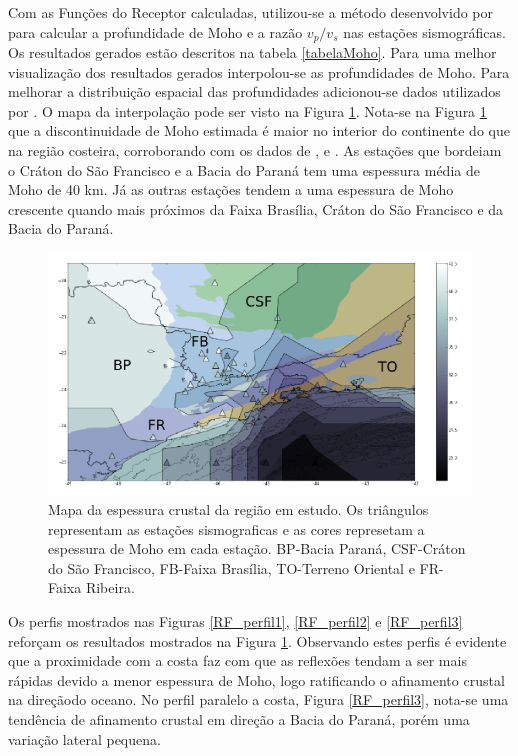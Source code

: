 Com as Funções do Receptor calculadas, utilizou-se a método desenvolvido por \cite{Zhu_Kanamori_2000} para calcular a profundidade de Moho e a razão $v_{p}/v_{s}$ nas estações sismográficas. Os resultados gerados estão descritos na tabela \ref{tabelaMoho}. Para uma melhor visualização dos resultados gerados interpolou-se as profundidades de Moho. Para melhorar a distribuição espacial das profundidades adicionou-se dados utilizados por \cite{Assumpcao_Brazil_2013}. O mapa da interpolação pode ser visto na Figura \ref{Interpolacao}. Nota-se na Figura \ref{Interpolacao} que a discontinuidade de Moho estimada é maior no interior do continente do que na região costeira, corroborando com os dados de \cite{Assumpcao_America_2013}, \cite{Assumpcao_Brazil_2013} e \cite{van_der_meijde_gravity_2013}. As estações que bordeiam o Cráton do São Francisco e a Bacia do Paraná tem uma espessura média de Moho de 40 km. Já as outras estações tendem a uma espessura de Moho crescente quando mais próximos da Faixa Brasília, Cráton do São Francisco e da Bacia do Paraná.

\begin{figure}[!ht]
\centering
\includegraphics[scale=0.5]{Figs/Interpolacao_Linear.png}
\caption[Mapa da espessura crustal da região em estudo.]{Mapa da espessura crustal da região em estudo. Os triângulos representam as estações sismograficas e as cores represetam a espessura de Moho em cada estação. BP-Bacia Paraná, CSF-Cráton do São Francisco, FB-Faixa Brasília, TO-Terreno Oriental  e FR-Faixa Ribeira.}
\label{Interpolacao}
\end{figure}

Os perfis mostrados nas Figuras \ref{RF_perfil1}, \ref{RF_perfil2} e \ref{RF_perfil3} reforçam  os resultados mostrados na Figura \ref{Interpolacao}. Observando estes perfis é evidente que a proximidade com a costa  faz com que as reflexões tendam a ser mais rápidas devido a menor espessura de Moho, logo ratificando o afinamento crustal na direçãodo oceano. No perfil paralelo a costa, Figura \ref{RF_perfil3}, nota-se uma tendência de afinamento crustal em direção a Bacia do Paraná, porém uma variação lateral pequena. 

